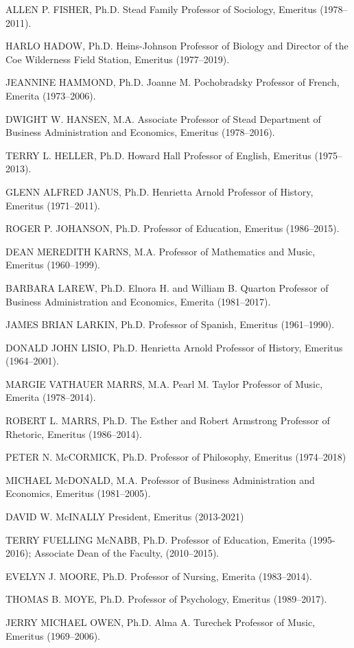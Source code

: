 \documentclass[
  letterpaper,
]{scrbook}
\begin{document}
ALLEN P. FISHER, Ph.D. Stead Family Professor of Sociology, Emeritus
(1978--2011).

HARLO HADOW, Ph.D. Heins-Johnson Professor of Biology and Director of
the Coe Wilderness Field Station, Emeritus (1977--2019).

JEANNINE HAMMOND, Ph.D. Joanne M. Pochobradsky Professor of French,
Emerita (1973--2006).

DWIGHT W. HANSEN, M.A. Associate Professor of Stead Department of
Business Administration and Economics, Emeritus (1978--2016).

TERRY L. HELLER, Ph.D. Howard Hall Professor of English, Emeritus
(1975--2013).

GLENN ALFRED JANUS, Ph.D. Henrietta Arnold Professor of History,
Emeritus (1971--2011).

ROGER P. JOHANSON, Ph.D. Professor of Education, Emeritus (1986--2015).

DEAN MEREDITH KARNS, M.A. Professor of Mathematics and Music, Emeritus
(1960--1999).

BARBARA LAREW, Ph.D. Elnora H. and William B. Quarton Professor of
Business Administration and Economics, Emerita (1981--2017).

JAMES BRIAN LARKIN, Ph.D. Professor of Spanish, Emeritus (1961--1990).

DONALD JOHN LISIO, Ph.D. Henrietta Arnold Professor of History, Emeritus
(1964--2001).

MARGIE VATHAUER MARRS, M.A. Pearl M. Taylor Professor of Music, Emerita
(1978--2014).

ROBERT L. MARRS, Ph.D. The Esther and Robert Armstrong Professor of
Rhetoric, Emeritus (1986--2014).

PETER N. McCORMICK, Ph.D. Professor of Philosophy, Emeritus (1974--2018)

MICHAEL McDONALD, M.A. Professor of Business Administration and
Economics, Emeritus (1981--2005).

DAVID W. McINALLY President, Emeritus (2013-2021)

TERRY FUELLING McNABB, Ph.D. Professor of Education, Emerita
(1995-2016); Associate Dean of the Faculty, (2010--2015).

EVELYN J. MOORE, Ph.D. Professor of Nursing, Emerita (1983--2014).

THOMAS B. MOYE, Ph.D. Professor of Psychology, Emeritus (1989--2017).

JERRY MICHAEL OWEN, Ph.D. Alma A. Turechek Professor of Music, Emeritus
(1969--2006).
\end{document}
